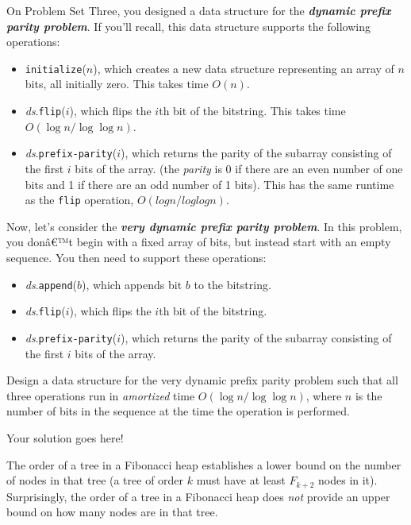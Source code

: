 \documentclass[12pt]{exam}
\newcommand{\Q}[1]{\question{\large{\textbf{#1}}}}
\newcommand{\bi}[1]{\textit{\textbf{#1}}}
\begin{document}
\begin{questions}
On Problem Set Three, you designed a data structure for the \bi{dynamic prefix parity problem}. If you'll recall, this data structure supports the following operations:
\begin{itemize}
    \item \texttt{initialize}($n$), which creates a new data structure representing an array of $n$ bits, all initially zero. This takes time $O(n)$.
    \item \textit{ds}.\texttt{flip}($i$), which flips the $i$th bit of the bitstring. This takes time $O(\log n / \log \log n)$.
    \item \textit{ds}.\texttt{prefix-parity}($i$), which returns the parity of the subarray consisting of the first $i$ bits of the array. (the \textit{parity} is 0 if there are an even number of one bits and 1 if there are an odd number of 1 bits). This has the same runtime as the \texttt{flip} operation, $O(log n / log log n)$.
\end{itemize}

Now, let's consider the \bi{very dynamic prefix parity problem}. In this problem, you donâ€™t begin with a fixed array of bits, but instead start with an empty sequence. You then need to support these operations:
\begin{itemize}
    \item \textit{ds}.\texttt{append}($b$), which appends bit $b$ to the bitstring. 
    \item \textit{ds}.\texttt{flip}($i$), which flips the $i$th bit of the bitstring.
    \item \textit{ds}.\texttt{prefix-parity}($i$), which returns the parity of the subarray consisting of the first $i$ bits of the array.
\end{itemize}
Design a data structure for the very dynamic prefix parity problem such that all three operations run in \textit{amortized} time $O(\log n / \log \log n)$, where $n$ is the number of bits in the sequence at the time the operation is performed. 

\begin{solution}
Your solution goes here!
\end{solution}

\newpage

\Q{Problem Three: Palos Altos (3 Points)}

The order of a tree in a Fibonacci heap establishes a lower bound on the number of nodes in that tree (a tree of order $k$ must have at least $F_{k+2}$ nodes in it). Surprisingly, the order of a tree in a Fibonacci heap does \textit{not} provide an upper bound on how many nodes are in that tree.


\end{questions}
\end{document}
